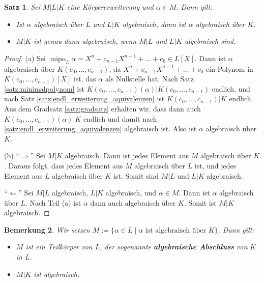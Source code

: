 \documentclass[a4paper, twoside, 11pt, ngerman]{report}
\DeclareMathOperator{\mipo}{mipo}
\theoremstyle{definistyle}
\newtheorem{satz}{Satz}[section]
\newtheorem{bem}[satz]{Bemerkung}
\theoremstyle{remark}
\begin{document}
\begin{satz}\label{satz:alpha_algebraisch_ueber_k}
Sei $M|L|K$ eine Körpererweiterung und $\alpha \in M$. Dann gilt:
\begin{itemize}
    \item[(a)] Ist $\alpha$ algebraisch über $L$ und $L|K$ algebraisch, dann ist $\alpha$ algebraisch über $K$.
    \item[(b)] $M|K$ ist genau dann algebraisch, wenn $M|L$ und $L|K$ algebraisch sind.
\end{itemize}
\end{satz}

\begin{proof}
(a) Sei $\mipo_L \alpha = X^n + c_{n-1} X^{n-1} + \dots + c_0 \in L[X]$. Dann ist $\alpha$ algebraisch über $K(c_0, \ldots, c_{n-1})$, da $X^n + c_{n-1} X^{n-1} + \dots + c_0$ ein Polynom in $K(c_0, \dots, c_{n-1})[X]$ ist, das $\alpha$ als Nullstelle hat. Nach Satz \ref{satz:minimalpolynom} ist $K(c_0, \ldots, c_{n-1})(\alpha)|K(c_0,\ldots,c_{n-1})$ endlich, und nach Satz \ref{satz:endl_erweiterung_aquivalenzen}
ist $K(c_0,\ldots,c_{n-1})|K$ endlich. Aus dem Gradsatz \ref{satz:gradsatz} erhalten wir, dass dann auch
 $K(c_0, \dots, c_{n-1})(\alpha)|K$ endlich und damit nach \ref{satz:endl_erweiterung_aquivalenzen} algebraisch ist. Also ist $\alpha$ algebraisch über $K$.

(b) "`$\Rightarrow$"' Sei $M|K$ algebraisch. Dann ist jedes Element aus $M$ algebraisch über $K$. Daraus folgt, dass jedes Element aus $M$ algebraisch über $L$ ist, und jedes Element aus $L$ algebraisch über $K$ ist. Somit sind $M|L$ und $L|K$ algebraisch.

"`$\Leftarrow$"' Sei $M|L$ algebraisch, $L|K$ algebraisch, und $\alpha \in M$. Dann ist $\alpha$ algebraisch über $L$. Nach Teil (a) ist $\alpha$ dann auch algebraisch über $K$. Somit ist $M|K$ algebraisch.
\end{proof}

\begin{bem}\label{bem:rel_algebraischer_abschluss}
Wir setzen $M := \{\alpha \in L \mid \alpha \text{ ist algebraisch über } K\}$. Dann gilt:
\begin{itemize}
    \item[(a)] $M$ ist ein Teilkörper von $L$, der sogenannte \textbf{algebraische Abschluss} von $K$ in $L$.
    \item[(b)] $M|K$ ist algebraisch.
\end{itemize}
\end{bem}
\end{document}
